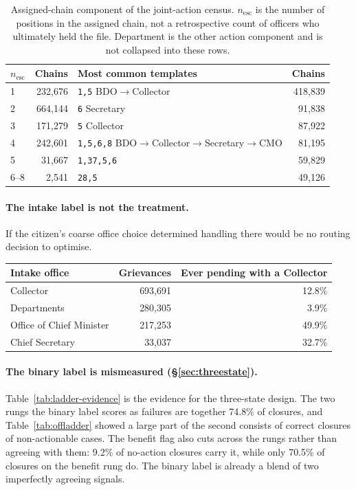 \documentclass[11pt,a4paper]{article}
\theoremstyle{plain}
\theoremstyle{definition}
\theoremstyle{remark}
\newcommand{\code}[1]{\texttt{\small #1}}
\begin{document}
\begin{table}[h]
\centering
\caption{Assigned-chain component of the joint-action census. $n_{\text{esc}}$ is the number
of positions in the assigned chain, not a retrospective count of officers who ultimately held
the file. Department is the other action component and is not collapsed into these rows.}
\label{tab:census}
\begin{tabular}{lr@{\qquad\qquad}lr}
\toprule
$n_{\text{esc}}$ & Chains & Most common templates & Chains\\
\midrule
1 & 232,676 & \code{1,5} BDO$\to$Collector & 418,839\\
2 & 664,144 & \code{6} Secretary & 91,838\\
3 & 171,279 & \code{5} Collector & 87,922\\
4 & 242,601 & \code{1,5,6,8} BDO$\to$Collector$\to$Secretary$\to$CMO & 81,195\\
5 & 31,667 & \code{1,37,5,6} & 59,829\\
6--8 & 2,541 & \code{28,5} & 49,126\\
\bottomrule
\end{tabular}
\end{table}

\paragraph{The intake label is not the treatment.} If the citizen's coarse office choice
determined handling there would be no routing decision to optimise.

\begin{center}
\begin{tabular}{lrr}
\toprule
Intake office & Grievances & Ever pending with a Collector\\
\midrule
Collector & 693,691 & 12.8\%\\
Departments & 280,305 & 3.9\%\\
Office of Chief Minister & 217,253 & 49.9\%\\
Chief Secretary & 33,037 & 32.7\%\\
\bottomrule
\end{tabular}
\end{center}

\paragraph{The binary label is mismeasured (\S\ref{sec:threestate}).}
Table~\ref{tab:ladder-evidence} is the evidence for the three-state design. The two rungs the
binary label scores as failures are together 74.8\% of closures, and Table~\ref{tab:offladder}
showed a large part of the second consists of correct closures of non-actionable cases. The
benefit flag also cuts across the rungs rather than agreeing with them: 9.2\% of no-action
closures carry it, while only 70.5\% of closures on the benefit rung do. The binary label is
already a blend of two imperfectly agreeing signals.
\end{document}
